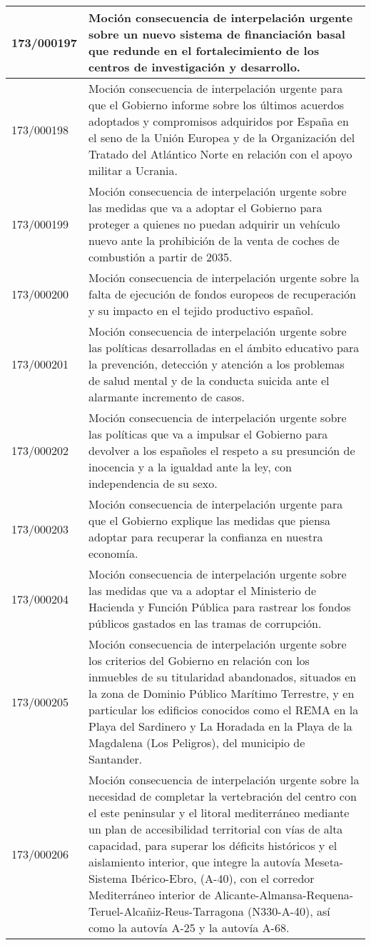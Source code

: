 {\begin{table}[H]
\begin{center}
\begin{tabularx}{\linewidth}{| l | X |}
\hline
173/000197 & Moción consecuencia de interpelación urgente sobre un nuevo sistema de financiación basal que redunde en el fortalecimiento de los centros de investigación y desarrollo. \\
\hline
173/000198 & Moción consecuencia de interpelación urgente para que el Gobierno informe sobre los últimos acuerdos adoptados y compromisos adquiridos por España en el seno de la Unión Europea y de la Organización del Tratado del Atlántico Norte en relación con el apoyo militar a Ucrania. \\
\hline
173/000199 & Moción consecuencia de interpelación urgente sobre las medidas que va a adoptar el Gobierno para proteger a quienes no puedan adquirir un vehículo nuevo ante la prohibición de la venta de coches de combustión a partir de 2035. \\
\hline
173/000200 & Moción consecuencia de interpelación urgente sobre la falta de ejecución de fondos europeos de recuperación y su impacto en el tejido productivo español. \\
\hline
173/000201 & Moción consecuencia de interpelación urgente sobre las políticas desarrolladas en el ámbito educativo para la prevención, detección y atención a los problemas de salud mental y de la conducta suicida ante el alarmante incremento de casos. \\
\hline
173/000202 & Moción consecuencia de interpelación urgente sobre las políticas que va a impulsar el Gobierno para devolver a los españoles el respeto a su presunción de inocencia y a la igualdad ante la ley, con independencia de su sexo. \\
\hline
173/000203 & Moción consecuencia de interpelación urgente para que el Gobierno explique las medidas que piensa adoptar para recuperar la confianza en nuestra economía. \\
\hline
173/000204 & Moción consecuencia de interpelación urgente sobre las medidas que va a adoptar el Ministerio de Hacienda y Función Pública para rastrear los fondos públicos gastados en las tramas de corrupción. \\
\hline
173/000205 & Moción consecuencia de interpelación urgente sobre los criterios del Gobierno en relación con los inmuebles de su titularidad abandonados, situados en la zona de Dominio Público Marítimo Terrestre, y en particular los edificios conocidos como el REMA en la Playa del Sardinero y La Horadada en la Playa de la Magdalena (Los Peligros), del municipio de Santander. \\
\hline
173/000206 & Moción consecuencia de interpelación urgente sobre la necesidad de completar la vertebración del centro con el este peninsular y el litoral mediterráneo mediante un plan de accesibilidad territorial con vías de alta capacidad, para superar los déficits históricos y el aislamiento interior, que integre la autovía Meseta-Sistema Ibérico-Ebro, (A-40), con el corredor Mediterráneo interior de Alicante-Almansa-Requena-Teruel-Alcañiz-Reus-Tarragona (N330-A-40), así como la autovía A-25 y la autovía A-68. \\

\end{tabularx}
\end{center}
\end{table}}
